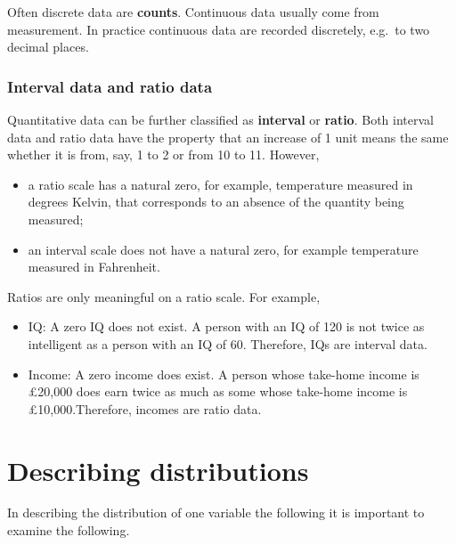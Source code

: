 \documentclass[
  british,
  11pt,
  openany, a4paper]{book}
\providecommand{\tightlist}{%
  \setlength{\itemsep}{0pt}\setlength{\parskip}{0pt}}
\begin{document}
Often discrete data are \textbf{counts}. Continuous data usually come from measurement. In practice continuous data are recorded discretely, e.g.~to two decimal places.

\subsubsection*{Interval data and ratio data}\label{interval-data-and-ratio-data}

Quantitative data can be further classified as \textbf{interval} or \textbf{ratio}. Both interval data and ratio data have the property that an increase of 1 unit means the same whether it is from, say, 1 to 2 or from 10 to 11. However,

\begin{itemize}
\tightlist
\item
  a ratio scale has a natural zero, for example, temperature measured in degrees Kelvin, that corresponds to an absence of the quantity being measured;
\item
  an interval scale does not have a natural zero, for example temperature measured in Fahrenheit.
\end{itemize}

Ratios are only meaningful on a ratio scale. For example,

\begin{itemize}
\tightlist
\item
  IQ: A zero IQ does not exist. A person with an IQ of 120 is not twice as intelligent as a person with an IQ of 60. Therefore, IQs are interval data.
\item
  Income: A zero income does exist. A person whose take-home income is \pounds 20,000 does earn twice as much as some whose take-home income is \pounds 10,000.Therefore, incomes are ratio data.
\end{itemize}

\section{Describing distributions}\label{describing-distributions}

In describing the distribution of one variable the following it is important to
examine the following.
\end{document}
